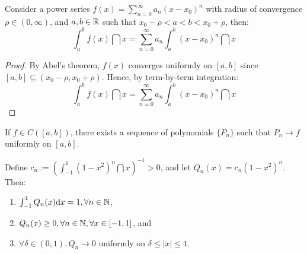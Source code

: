 \begin{theorem}
    Consider a power series $f(x) = \sum_{n=0}^\infty a_n(x - x_0)^n$ with radius of convergence $\rho \in (0, \infty)$, and $a,b \in \mathbb{R}$ such that $x_0 - \rho < a < b < x_0 + \rho$, then:
    \begin{equation*}
        \int_a^b f(x) \dint x = \sum \limits_{n = 0}^\infty a_n \int_a^b (x - x_0)^n \dint x
    \end{equation*}
\end{theorem}

\begin{proof}
    By Abel's theorem, $f(x)$ converges uniformly on $[a,b]$ since $[a,b] \subseteq (x_0 -\rho, x_0 + \rho)$. Hence, by term-by-term integration:
    \begin{equation*}
        \int_a^b f(x) \dint x = \sum \limits_{n = 0}^\infty a_n \int_a^b (x - x_0)^n \dint x
    \end{equation*}
\end{proof}

\begin{theorem}
    If $f \in C([a,b])$, there exists a sequence of polynomials $\{ P_n\}$ such that $P_n \to f$ uniformly on $[a,b]$.
\end{theorem}

\begin{theorem}
    Define $c_n := (\int_{-1}^1 (1 - x^2)^n \dint x)^{-1} > 0$, and let $Q_n(x) = c_n(1 - x^2)^n$. Then:
    \begin{enumerate}
        \item $\int_{-1}^1 Q_n(x) \text{d} x = 1, \forall n \in \mathbb{N}$,
        \item $Q_n(x) \geq 0, \forall n \in \mathbb{N}, \forall x \in [-1, 1]$, and
        \item $\forall \delta \in (0,1), Q_n \to 0$ uniformly on $\delta \leq |x| \leq 1$.
    \end{enumerate}
\end{theorem}


